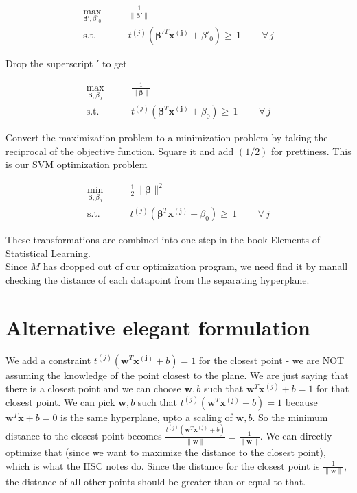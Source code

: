 \documentclass{article}
\newcommand{\beq}{\begin{equation}}
\newcommand{\eeq}{\end{equation}}
\begin{document}
\beq
\label{eqn:formulation5}
\begin{aligned}
  \max_{\pmb{\beta}',\beta'_0} &  \qquad \frac{1}{\|\pmb{\beta}'\|} \\
  \textrm{s.t.} & \qquad {t^{(j)}({\pmb{\beta}'}^T{\pmb{x^{(j)}}} + \beta'_0)} \ge\, 1  \, \qquad \forall \,{j}
\end{aligned}
\eeq

Drop the superscript $'$ to get 

\beq
\label{eqn:formulation6}
\begin{aligned}
  \max_{\pmb{\beta},\beta_0} &  \qquad \frac{1}{\|\pmb{\beta}\|} \\
  \textrm{s.t.} & \qquad {t^{(j)}({\pmb{\beta}}^T{\pmb{x^{(j)}}} + \beta_0)} \ge \, 1  \, \qquad \forall \,{j}
\end{aligned}
\eeq

Convert the maximization problem to a minimization problem by taking the reciprocal of the objective function. Square it and add $(1/2)$ for prettiness. This is our SVM optimization problem

\beq
\label{eqn:formulation7}
\begin{aligned}
  \min_{\pmb{\beta},\beta_0} &  \qquad \frac{1}{2}{\|\pmb{\beta}\|^2} \\
  \textrm{s.t.} & \qquad {t^{(j)}({\pmb{\beta}}^T{\pmb{x^{(j)}}} + \beta_0)} \ge \, 1  \, \qquad \forall \,{j}
\end{aligned}
\eeq

These transformations are combined into one step in the book Elements of Statistical Learning. \\

Since $M$ has dropped out of our optimization program, we need find it by manall checking the distance of each datapoint from the separating hyperplane.


\section{Alternative elegant formulation}

We add a constraint $t^{(j)}(\pmb{w}^T\pmb{x^{(j)}}+b)=1$ for the closest point - we are NOT assuming the knowledge of the point closest to the plane. We are just saying that there is a closest point and we can choose $\pmb{w},b$ such that $\pmb{w}^T\pmb{x}^{(j)}+b=1$ for that closest point. We can pick $\pmb{w},b$ such that $t^{(j)}(\pmb{w}^T\pmb{x^{(j)}}+b)=1$ because $\pmb{w}^T\pmb{x}+b=0$ is the same hyperplane, upto a scaling of $\pmb{w},b$. So the minimum distance to the closest point becomes $\frac{t^{(j)}(\pmb{w}^T\pmb{x^{(j)}}+b)}{\|\pmb{w}\|}=\frac{1}{\|\pmb{w}\|}$. We can directly optimize that (since we want to maximize the distance to the closest point), which is what the IISC notes do. Since the distance for the closest point is $\frac{1}{\|\pmb{w}\|}$, the distance of all other points should be greater than or equal to that.\\
\end{document}

